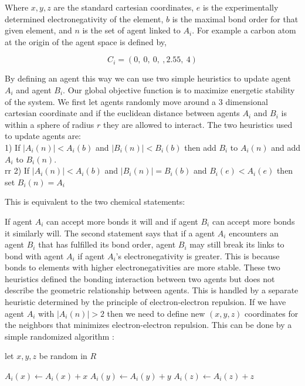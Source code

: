 \documentclass[aps,floatfix,prd,showpacs]{revtex4}
\begin{document}
Where $x,y,z$ are the standard cartesian coordinates, $e$ is the experimentally determined electronegativity of the element, $b$ is the maximal bond order for that given element, and $n$ is the set of agent linked to $A_i$. For example a carbon atom at the origin of the agent space is defined by,

$$C_i = (0, \ 0, \ 0, \ , 2.55, \ 4)$$

By defining an agent this way we can use two simple heuristics to update agent $A_i$ and agent $B_i$. Our global objective function is to maximize energetic stability of the system. We first let agents randomly move around a 3 dimensional cartesian coordinate and if the euclidean distance between agents $A_i$ and $B_i$ is within a sphere of radius $r$ they are allowed to interact. The two heuristics used to update agents are:\\

1) If $|A_i(n)| < A_i(b)$ and  $|B_i(n)| < B_i(b)$  then add $B_i$ to $A_i(n)$ and add $A_i$ to $B_i(n)$. 
\\rr
  2) If $|A_i(n)| < A_i(b)$ and $|B_i(n)| = B_i(b)$ and $B_i(e) < A_i(e)$  then set $B_i(n) =  {A_i}$
  
 This is equivalent to the two chemical statements:
 
  If agent $A_i$ can accept more bonds it will and if agent $B_i$ can accept more bonds it similarly will. 
  The second statement says that if a agent $A_i$ encounters an agent $B_i$ that has fulfilled its bond order, agent $B_i$ may still break its links to bond with agent $A_i$ if agent $A_i$'s electronegativity is greater. This is because bonds to elements with higher electronegativities are more stable. These two heuristics defined the bonding interaction between two agents but does not describe the geometric relationship between agents. This is handled by a separate heuristic determined by the principle of electron-electron repulsion. If we have agent $A_i$ with $|A_i(n)| > 2 $ then we need to define new $(x,y,z)$ coordinates for the neighbors that minimizes electron-electron repulsion. This can be done by a simple randomized algorithm :
  \begin{algorithmic}
  \State let $x,y,z$ be random in $R$
  
    \State $A_i(x) \gets A_i(x) + x$
     \State $A_i(y) \gets A_i(y) + y$
      \State $A_i(z) \gets A_i(z) + z$
\EndIf
\EndFor
\end{algorithmic}
\end{document}
